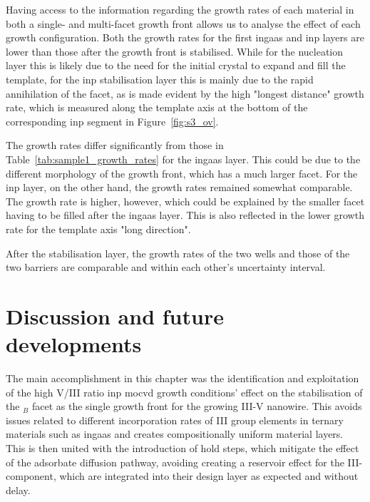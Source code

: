 Having access to the information regarding the growth rates of each material in both a single- and multi-facet growth front allows us to analyse the effect of each growth configuration. Both the  growth rates for the first \acs{ingaas} and \acs{inp} layers are lower than those after the growth front is stabilised. While for the nucleation layer this is likely due to the need for the initial crystal to expand and fill the template, for the \acs{inp} stabilisation layer this is mainly due to the rapid annihilation of the  facet, as is made evident by the high "longest distance" growth rate, which is measured along the  template axis at the bottom of the corresponding \acs{inp} segment in Figure~\ref{fig:s3_ov}.

The growth rates differ significantly from those in Table~\ref{tab:sample1_growth_rates} for the \acs{ingaas} layer. This could be due to the different morphology of the growth front, which has a much larger  facet. For the \acs{inp} layer, on the other hand, the growth rates remained somewhat comparable. The  growth rate is higher, however, which could be explained by the smaller  facet having to be filled after the \acs{ingaas} layer. This is also reflected in the lower growth rate for the  template axis "long direction".

After the stabilisation layer, the growth rates of the two wells and those of the two barriers are comparable and within each other's uncertainty interval.
\par

\section{Discussion and future developments}

The main accomplishment in this chapter was the identification and exploitation of the high V/III ratio \acs{inp} \acs{mocvd} growth conditions' effect on the stabilisation of the \(_B\) facet as the single growth front for the growing III-V nanowire. This avoids issues related to different incorporation rates of III group elements in ternary materials such as \acs{ingaas} \cite{Borg2019} and creates compositionally uniform material layers. This is then united with the introduction of hold steps, which mitigate the effect of the adsorbate diffusion pathway, avoiding creating a reservoir effect for the III-component, which are integrated into their design layer as expected and without delay. 

